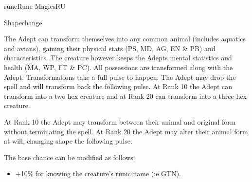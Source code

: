 \documentclass[a4paper]{article}
\begin{document}
\begin{college}[2.0]{rune}{Rune Magics}{RU}
\begin{spell}[S-20]{Shapechange}

\begin{effects}
The Adept can transform themselves into any common animal (includes
aquatics and avians), gaining their physical stats (PS, MD, AG, EN \&
PB) and characteristics.  The creature however keeps the Adepts mental
statistics and health (MA, WP, FT \& PC).  All possessions are
transformed along with the Adept.  Transformations take a full pulse
to happen.  The Adept may drop the spell and will transform back the
following pulse.  At Rank 10 the Adept can transform into a two hex
creature and at Rank 20 can transform into a three hex creature.

At Rank 10 the Adept may transform between their animal and original
form without terminating the spell.  At Rank 20 the Adept may alter
their animal form at will, changing shape the following pulse.

The base chance can be modified as follows:
\begin{itemize}
\item +10\% for knowing the creature's runic name (ie GTN).
\end{itemize}

\end{effects}
\end{spell}
\end{college}
\end{document}
